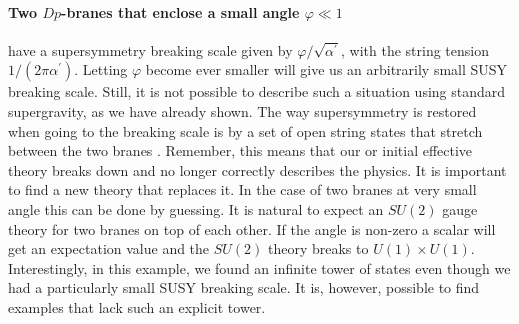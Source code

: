 \documentclass[12pt]{report}
\begin{document}
\paragraph{Two $Dp$-branes that enclose a small angle $\varphi \ll 1$} have a supersymmetry breaking scale given by $\varphi/\sqrt{\alpha^\prime}$, with the string tension $1/(2\pi \alpha^\prime)$. Letting $\varphi$ become ever smaller will give us an arbitrarily small SUSY breaking scale. Still, it is not possible to describe such a situation using standard supergravity, as we have already shown. The way supersymmetry is restored when going to the breaking scale is by a set of open string states that stretch between the two branes \cite{Berkooz:1996km,Anastasopoulos:2011hj,Anastasopoulos:2016cmg}. Remember, this means that our or initial effective theory breaks down and no longer correctly describes the physics. It is important to find a new theory that replaces it. In the case of two branes at very small angle this can be done by guessing. It is natural to expect an $SU(2)$ gauge theory for two branes on top of each other. If the angle is non-zero a scalar will get an expectation value and the $SU(2)$ theory breaks to $U(1)\times U(1)$. Interestingly, in this example, we found an infinite tower of states even though we had a particularly small SUSY breaking scale. It is, however, possible to find examples that lack such an explicit tower.
\end{document}
